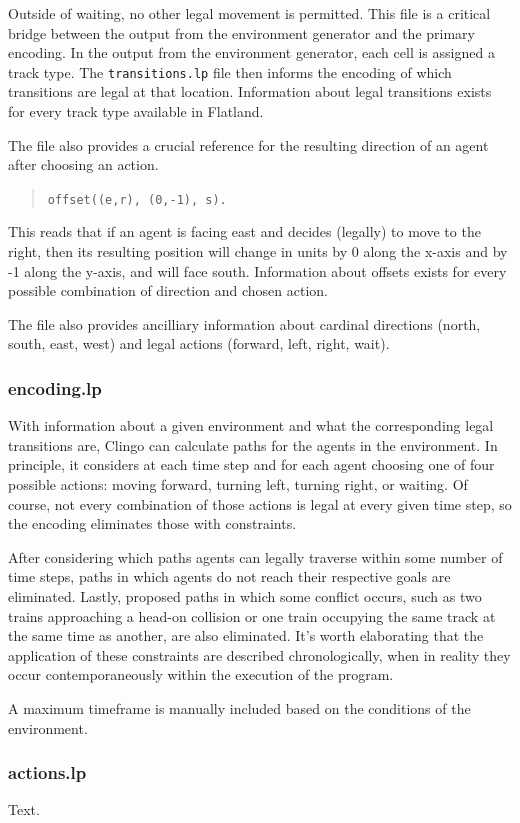 \documentclass[11pt]{article}
\begin{document}
\noindent Outside of waiting, no other legal movement is permitted. This file is a critical bridge between the output from the environment generator and the primary encoding. In the output from the environment generator, each cell is assigned a track type. The \texttt{transitions.lp} file then informs the encoding of which transitions are legal at that location. Information about legal transitions exists for every track type available in Flatland.

The file also provides a crucial reference for the resulting direction of an agent after choosing an action.

\begin{quote}
	\texttt{offset((e,r), (0,-1), s).}
\end{quote}

\noindent This reads that if an agent is facing east and decides (legally) to move to the right, then its resulting position will change in units by 0 along the x-axis and by -1 along the y-axis, and will face south. Information about offsets exists for every possible combination of direction and chosen action.

The file also provides ancilliary information about cardinal directions (north, south, east, west) and legal actions (forward, left, right, wait).

\subsubsection{encoding.lp}
With information about a given environment and what the corresponding legal transitions are, Clingo can calculate paths for the agents in the environment.  In principle, it considers at each time step and for each agent choosing one of four possible actions: moving forward, turning left, turning right, or waiting.  Of course, not every combination of those actions is legal at every given time step, so the encoding eliminates those with constraints.

After considering which paths agents can legally traverse within some number of time steps, paths in which agents do not reach their respective goals are eliminated.  Lastly, proposed paths in which some conflict occurs, such as two trains approaching a head-on collision or one train occupying the same track at the same time as another, are also eliminated.  It's worth elaborating that the application of these constraints are described chronologically, when in reality they occur contemporaneously within the execution of the program.

A maximum timeframe is manually included based on the conditions of the environment.

\subsubsection{actions.lp}
Text.



\end{document}
